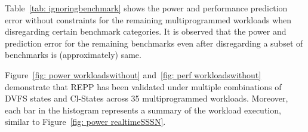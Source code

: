 Table~\ref{tab: ignoringbenchmark} shows the power and performance prediction error
without constraints for the remaining multiprogrammed workloads when disregarding certain
benchmark categories. It is observed that the power and prediction error for the remaining
benchmarks even after disregarding a subset of benchmarks is (approximately) same. 

Figure~\ref{fig: power workloadswithout} and~\ref{fig: perf workloadswithout} demonstrate that REPP
has been validated under multiple combinations of DVFS states and Cl-States across 35
multiprogrammed workloads. Moreover, each bar in the histogram represents a summary of the
workload execution, similar to Figure~\ref{fig: power realtimeSSSN}.

